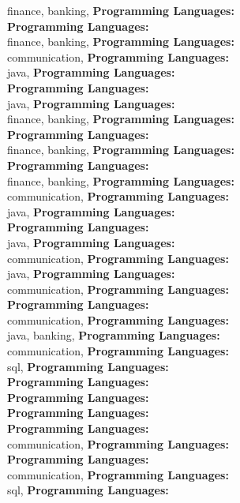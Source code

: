 finance, banking, \textbf{Programming Languages:} \\
\textbf{Programming Languages:} \\
finance, banking, \textbf{Programming Languages:} \\
communication, \textbf{Programming Languages:} \\
java, \textbf{Programming Languages:} \\
\textbf{Programming Languages:} \\
java, \textbf{Programming Languages:} \\
finance, banking, \textbf{Programming Languages:} \\
\textbf{Programming Languages:} \\
finance, banking, \textbf{Programming Languages:} \\
\textbf{Programming Languages:} \\
finance, banking, \textbf{Programming Languages:} \\
communication, \textbf{Programming Languages:} \\
java, \textbf{Programming Languages:} \\
\textbf{Programming Languages:} \\
java, \textbf{Programming Languages:} \\
communication, \textbf{Programming Languages:} \\
java, \textbf{Programming Languages:} \\
communication, \textbf{Programming Languages:} \\
\textbf{Programming Languages:} \\
communication, \textbf{Programming Languages:} \\
java, banking, \textbf{Programming Languages:} \\
communication, \textbf{Programming Languages:} \\
sql, \textbf{Programming Languages:} \\
\textbf{Programming Languages:} \\
\textbf{Programming Languages:} \\
\textbf{Programming Languages:} \\
\textbf{Programming Languages:} \\
communication, \textbf{Programming Languages:} \\
\textbf{Programming Languages:} \\
communication, \textbf{Programming Languages:} \\
sql, \textbf{Programming Languages:} \\
